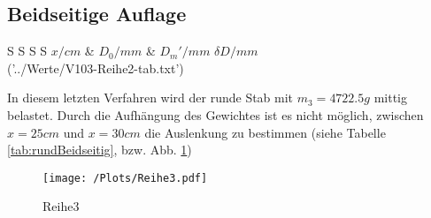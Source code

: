 \subsection{Beidseitige Auflage}
\label{sec:Beidseitig}

\begin{table}
  \centering
\caption{Auslenkung des runden Stabes bei beidseitiger Auflage}
\label{tab:rundBeidseitig}
\begin{tabular}{S S S S}
  \toprule
  {$x/cm$} & {$D_0/mm$} & {$D_m'/mm$} {$\delta D/mm$}\\
  \midrule
  ('../Werte/V103-Reihe2-tab.txt')
\bottomrule
\end{tabular}
\end{table}
\FloatBarrier

In diesem letzten Verfahren wird der runde Stab mit $m_{3}=4722.5g$ mittig belastet. Durch die Aufhängung des Gewichtes ist es nicht möglich, zwischen $x = 25cm$ und $x = 30cm$ die Auslenkung zu bestimmen (siehe Tabelle \ref{tab:rundBeidseitig}, bzw. Abb. \ref{fig:Reihe3})

\begin{figure}
  \centering
  \texttt{[image: /Plots/Reihe3.pdf]}
  \caption{Reihe3}
  \label{fig:Reihe3}
\end{figure}

